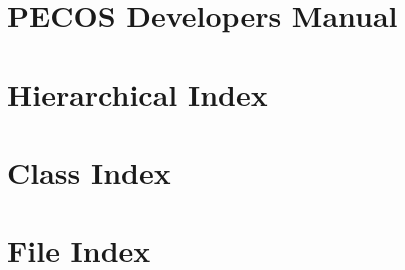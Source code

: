 \documentclass[letterpaper]{book}
\begin{document}
\cleardoublepage
\tableofcontents
\cleardoublepage
\chapter{P\+E\+C\+OS Developers Manual}
\label{index}\hypertarget{index}{}
\chapter{Hierarchical Index}

\chapter{Class Index}

\chapter{File Index}

\end{document}
